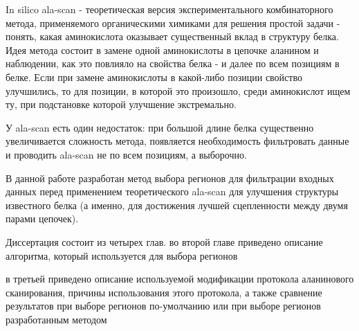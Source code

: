 \intro

In silico ala-scan - теоретическая версия экспериментального комбинаторного метода, применяемого органическими химиками для решения простой задачи - понять, какая аминокислота оказывает существенный вклад в структуру белка. Идея метода состоит в замене одной аминокислоты в цепочке аланином и наблюдении, как это повлияло на свойства белка - и далее по всем позициям в белке. Если при замене аминокислоты в какой-либо позиции свойство улучшились, то для позиции, в которой это произошло, среди аминокислот ищем ту, при подстановке которой улучшение экстремально.

У ala-scan есть один недостаток: при большой длине белка существенно увеличивается сложность метода, появляется необходимость фильтровать данные и проводить ala-scan не по всем позициям, а выборочно.


В данной работе разработан метод выбора регионов для фильтрации входных данных перед применением теоретического ala-scan для улучшения структуры известного белка (а именно, для достижения лучшей сцепленности между двумя парами цепочек). 



Диссертация состоит из четырех глав. 
во второй главе приведено описание алгоритма, который используется для выбора регионов

в третьей приведено описание используемой модификации протокола аланинового сканирования, причины использования этого протокола, а также сравнение результатов при выборе регионов по-умолчанию или при выборе регионов разработанным методом 

